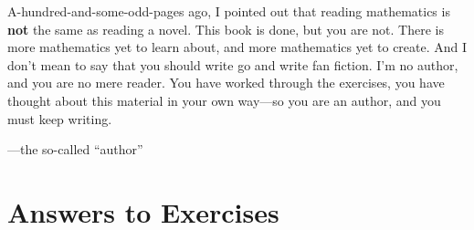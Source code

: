 \documentclass[justified]{tufte-book}
\begin{document}
A-hundred-and-some-odd-pages ago, I pointed out that reading
mathematics is \textbf{not} the same as reading a novel.  This book is
done, but you are not.  There is more mathematics yet to learn about,
and more mathematics yet to create.  And I don't mean to say that you
should write go and write fan fiction.  I'm no author, and you are no
mere reader.  You have worked through the exercises, you have thought
about this material in your own way---so you are an author, and you
must keep writing.

\vspace{0.5in}
\hfill---the so-called ``author''

%
%

\finalizeanswers
\chapter*{Answers to Exercises}
\small
{}
\normalsize
\backmatter

\printindex
\end{document}
